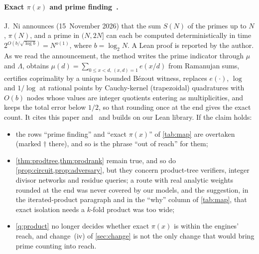 \documentclass[10pt]{amsart}
\theoremstyle{plain}
\theoremstyle{definition}
\theoremstyle{remark}
\numberwithin{equation}{section}
\begin{document}
\paragraph{Exact $\pi(x)$ and prime finding~\cite{Ni26}.} J.~Ni announces (15~November 2026) that the
sum $S(N)$ of the primes up to $N$, $\pi(N)$, and a prime in $(N,2N]$ can each be computed
deterministically in time $2^{O(b/\sqrt{\log b})}=N^{o(1)}$, where $b=\log_2N$. A Lean proof is
reported by the author. As we read the announcement, the method writes the prime indicator through
$\mu$ and $\Lambda$, obtains $\mu(d)=\sum_{0\le x<d,\,(x,d)=1}e(x/d)$ from Ramanujan sums, certifies
coprimality by a unique bounded B\'ezout witness, replaces $e(\cdot)$, $\log$ and $1/\log$ at rational
points by Cauchy-kernel (trapezoidal) quadratures with $O(b)$ nodes whose values are integer
quotients entering as multiplicities, and keeps the total error below $1/2$, so that rounding once at
the end gives the exact count. It cites this paper and~\cite{TulPar26} and builds on our Lean
library. If the claim holds:
\begin{itemize}
\item the rows ``prime finding'' and ``exact $\pi(x)$'' of \cref{tab:map} are overtaken (marked
$\dagger$ there), and so is the phrase ``out of reach'' for them;
\item \cref{thm:prodtree,thm:prodrank} remain true, and so do \cref{prop:circuit,prop:adversary}, but they
concern product-tree verifiers, integer divisor networks and residue queries; a route with real analytic
weights rounded at the end was never covered by our models, and the suggestion, in the
iterated-product paragraph and in the ``why'' column of \cref{tab:map}, that exact isolation needs a
$k$-fold product was too wide;
\item \cref{q:product} no longer decides whether exact $\pi(x)$ is within the engines' reach, and
change~(iv) of \cref{sec:change} is not the only change that would bring prime counting into reach.
\end{itemize}
\end{document}
